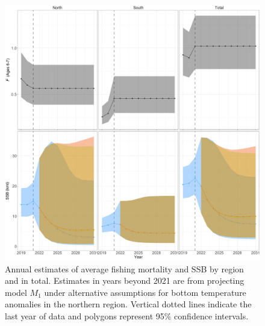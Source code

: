 \documentclass[
]{article}
\begin{document}
\begin{figure}

{\centering \includegraphics[height=0.95\textheight]{proj_F_SSB} 

}

\caption{Annual estimates of average fishing mortality and SSB by region and in total. Estimates in years beyond 2021 are from projecting model $M_1$ under alternative assumptions for bottom temperature anomalies in the northern region. Vertical dotted lines indicate the last year of data and polygons represent 95\% confidence intervals.}\label{fig:F-SSB-proj}
\end{figure}
\end{document}
